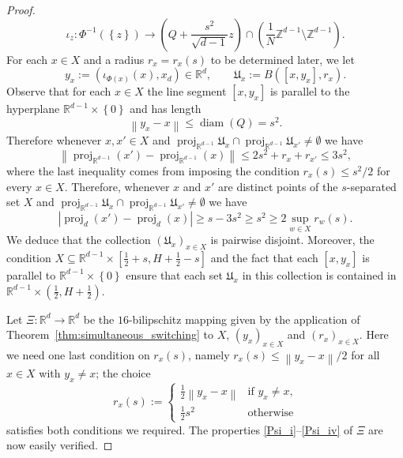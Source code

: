 \documentclass[10pt,a4paper]{amsart}
\DeclareMathOperator{\diam}{diam}
\DeclareMathOperator{\proj}{proj}
\newcommand{\R}{\mathbb{R}}
\newcommand{\Z}{\mathbb{Z}}
\newcommand{\abs}[1]{\left|#1\right|}
\newcommand{\br}[1]{\left(#1\right)}
\newcommand{\enorm}[1]{\left\|#1\right\|}
\newcommand{\mf}[1]{\mathfrak{#1}}
\newcommand{\set}[1]{\left\{#1\right\}}
\newcommand{\sqbr}[1]{\left[#1\right]}
\begin{document}
\begin{proof}
	\begin{equation*}
	\iota_{z}\colon \Phi^{-1}(\set{z})\to \br{Q+\frac{s^{2}}{\sqrt{d-1}}z}\cap \br{\frac{1}{N}\Z^{d-1}\setminus \Z^{d-1}}.
	\end{equation*}
	For each $x\in X$ and a radius $r_{x}=r_{x}(s)$ to be determined later, we let 
	\begin{equation*}
	y_{x}:=(\iota_{\Phi(x)}(x),x_{d})\in \R^{d}, \qquad \mf{U}_{x}:=B([x,y_{x}],r_{x}).
	\end{equation*}
	Observe that for each $x\in X$ the line segment $[x,y_{x}]$ is parallel to the hyperplane $\R^{d-1}\times\set{0}$ and has length 
	\begin{equation}\label{eq:dist_x-y_x}
	\enorm{y_{x}-x}\leq \diam\br{Q}=s^{2}.
	\end{equation}
	Therefore whenever $x,x'\in X$ and $\proj_{\R^{d-1}}\mf{U}_{x}\cap \proj_{\R^{d-1}}{\mf{U}_{x'}}\neq \emptyset$ we have 
	\begin{equation*}
	\enorm{\proj_{\R^{d-1}}(x')-\proj_{\R^{d-1}}(x)}\leq 2s^{2}+ r_{x}+r_{x'}\leq 3s^{2},
	\end{equation*}
	where the last inequality comes from imposing the condition $r_{x}(s)\leq s^{2}/2$ for every $x\in X$. Therefore, whenever $x$ and $x'$ are distinct points of the $s$-separated set $X$ and $\proj_{\R^{d-1}}\mf{U}_{x}\cap \proj_{\R^{d-1}}{\mf{U}_{x'}}\neq \emptyset$ we have
	\begin{equation*}
	\abs{\proj_{d}(x')-\proj_{d}(x)}\geq s-3s^{2}\geq s^{2}\geq 2\sup_{w\in X}r_{w}(s).
	\end{equation*}
	We deduce that the collection $\br{\mf{U}_{x}}_{x\in X}$ is pairwise disjoint. Moreover, the condition $X\subseteq \R^{d-1}\times \sqbr{\frac{1}{2}+s,H+\frac{1}{2}-s}$ and the fact that each $[x,y_{x}]$ is parallel to $\R^{d-1}\times \set{0}$ ensure that each set $\mf{U}_{x}$ in this collection is contained in $\R^{d-1}\times \br{\frac{1}{2},H+\frac{1}{2}}$. 
	
	
	Let $\Xi\colon \R^{d}\to\R^{d}$ be the $16$-bilipschitz mapping given by the application of Theorem~\ref{thm:simultaneous_switching} to $X$, $(y_{x})_{x\in X}$ and $(r_{x})_{x\in X}$.
	Here we need one last condition on $r_{x}(s)$, namely $r_{x}(s)\leq \enorm{y_{x}-x}/2$ for all $x\in X$ with $y_{x}\neq x$; the choice
	\begin{equation*}
	r_{x}(s):=\begin{cases}
	\frac{1}{2}\enorm{y_{x}-x} & \text{if $y_{x}\neq x$,}\\
	\frac{1}{2}s^{2} & \text{otherwise}
	\end{cases}
	\end{equation*}
	satisfies both conditions we required. The properties \eqref{Psi_i}--\eqref{Psi_iv} of $\Xi$ are now easily verified.
	

\end{proof}
\end{document}
